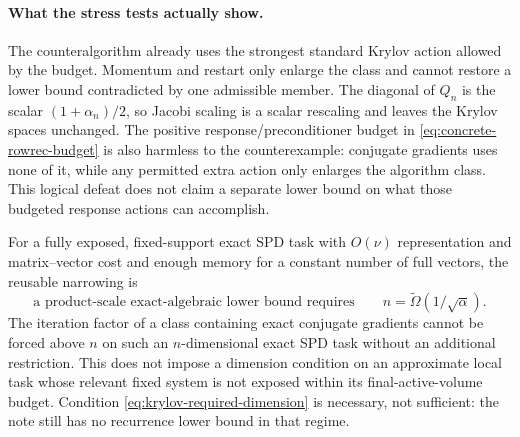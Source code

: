 \paragraph{What the stress tests actually show.}
The counteralgorithm already uses the strongest standard Krylov action allowed
by the budget.  Momentum and restart only enlarge the class and cannot restore
a lower bound contradicted by one admissible member.  The diagonal of $Q_n$ is
the scalar $(1+\alpha_n)/2$, so Jacobi scaling is a scalar rescaling and leaves
the Krylov spaces unchanged.  The positive response/preconditioner budget in
\cref{eq:concrete-rowrec-budget} is also harmless to the counterexample:
conjugate gradients uses none of it, while any permitted extra action only
enlarges the algorithm class.  This logical defeat does not claim a separate
lower bound on what those budgeted response actions can accomplish.

For a fully exposed, fixed-support exact SPD task with
$O(\nu)$ representation and matrix--vector cost and enough memory for a
constant number of full vectors, the reusable narrowing is
\begin{equation}
 \text{a product-scale exact-algebraic lower bound requires}\qquad
 n=\widetilde\Omega(1/\sqrt\alpha).
 \label{eq:krylov-required-dimension}
\end{equation}
The iteration factor of a class containing exact conjugate gradients cannot
be forced above $n$ on such an $n$-dimensional exact SPD task without an
additional restriction.  This does not impose a dimension condition on an
approximate local task whose relevant fixed system is not exposed within its
final-active-volume budget.
Condition \cref{eq:krylov-required-dimension} is necessary, not sufficient:
the note still has no recurrence lower bound in that regime.
